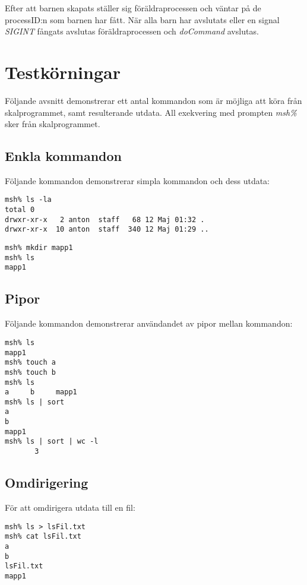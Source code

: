 \documentclass[a4paper, 12pt]{article}
\begin{document}
Efter att barnen skapats ställer sig föräldraprocessen och väntar på
de processID:n som barnen har fått. När alla barn har avslutats eller
en signal \textit{SIGINT} fångats avslutas föräldraprocessen och
\textit{doCommand} avslutas.

\section{Testkörningar}\label{sec:testkorningar}
Följande avsnitt demonstrerar ett antal kommandon som är möjliga att
köra från skalprogrammet, samt resulterande utdata. All exekvering med
prompten \textit{msh\%} sker från skalprogrammet.

\subsection{Enkla kommandon}\label{sec:enkla-kommandon}
Följande kommandon demonstrerar simpla kommandon och dess utdata:

\begin{scriptsize}
\begin{verbatim}
msh% ls -la
total 0
drwxr-xr-x   2 anton  staff   68 12 Maj 01:32 .
drwxr-xr-x  10 anton  staff  340 12 Maj 01:29 ..
\end{verbatim}
\end{scriptsize}

\begin{scriptsize}
\begin{verbatim}
msh% mkdir mapp1
msh% ls
mapp1
\end{verbatim}
\end{scriptsize}

\subsection{Pipor}\label{sec:pipor}
Följande kommandon demonstrerar användandet av pipor mellan kommandon:
\begin{scriptsize}
\begin{verbatim}
msh% ls
mapp1
msh% touch a            
msh% touch b
msh% ls
a     b     mapp1
msh% ls | sort
a
b
mapp1
msh% ls | sort | wc -l
       3
\end{verbatim}
\end{scriptsize}

\subsection{Omdirigering}\label{sec:omdirigering}
För att omdirigera utdata till en fil:
\begin{scriptsize}
\begin{verbatim}
msh% ls > lsFil.txt
msh% cat lsFil.txt
a
b
lsFil.txt
mapp1
\end{verbatim}
\end{scriptsize}
\end{document}
